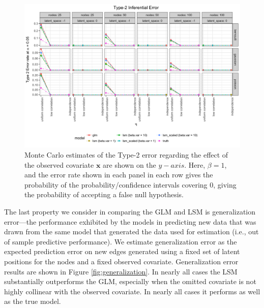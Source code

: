 \documentclass[11pt]{article}
\begin{document}
\begin{figure}
\includegraphics[width=\textwidth]{figures/inference_type_2.png}
\caption{Monte Carlo estimates of the Type-2 error regarding the effect of the observed covariate $\mathbf{x}$ are shown on the $y-axis$. Here, $\beta = 1$, and the error rate shown in each panel in each row gives the probability of the probability/confidence intervals covering $0$, giving the probability of accepting a false null hypothesis. \label{fig:inference_type_2}}
\end{figure}

The last property we consider in comparing the GLM and LSM is generalization error---the performance exhibited by the models in predicting new data that was drawn from the same model that generated the data used for estimation (i.e., out of sample predictive performance). We estimate generalization error as the expected prediction error on new edges generated using a fixed set of latent positions for the nodes and a fixed observed covariate. Generalization error results are shown in Figure \ref{fig:generalization}. In nearly all cases the LSM substantially outperforms the GLM, especially when the omitted covariate is not highly collinear with the observed covariate. In nearly all cases it performs as well as the true model.
\end{document}
